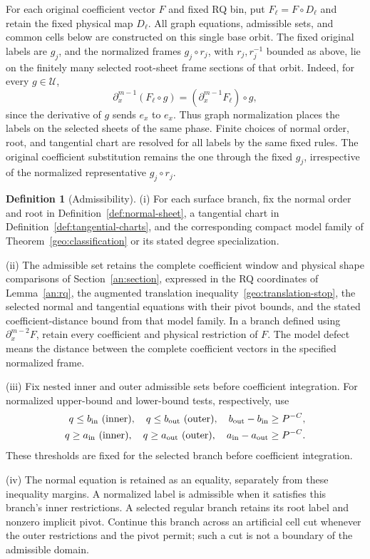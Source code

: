 \documentclass[11pt]{amsart}
\theoremstyle{definition}
\newtheorem{definition}{Definition}[section]
\theoremstyle{remark}
\numberwithin{equation}{section}
\begin{document}
For each original coefficient vector $F$ and fixed RQ bin, put $F_\ell=F\circ D_\ell$ and retain the fixed physical map $D_\ell$. All graph equations, admissible sets, and common cells below are constructed on this single base orbit. The fixed original labels are $g_j$, and the normalized frames $g_j\circ r_j$, with $r_j,r_j^{-1}$ bounded as above, lie on the finitely many selected root-sheet frame sections of that orbit. Indeed, for every $g\in\mathcal U$,
\[
\partial_x^{m-1}(F_\ell\circ g)=(\partial_x^{m-1}F_\ell)\circ g,
\]
since the derivative of $g$ sends $e_x$ to $e_x$. Thus graph normalization places the labels on the selected sheets of the same phase. Finite choices of normal order, root, and tangential chart are resolved for all labels by the same fixed rules. The original coefficient substitution remains the one through the fixed $g_j$, irrespective of the normalized representative $g_j\circ r_j$.

\begin{definition}[Admissibility]\label{def:admissibility}
\leavevmode\noindent\textup{(i)} For each surface branch, fix the normal order and root in Definition~\ref{def:normal-sheet}, a tangential chart in Definition~\ref{def:tangential-charts}, and the corresponding compact model family of Theorem~\ref{geo:classification} or its stated degree specialization.

\noindent\textup{(ii)} The admissible set retains the complete coefficient window and physical shape comparisons of Section~\ref{an:section}, expressed in the RQ coordinates of Lemma~\ref{an:rq}, the augmented translation inequality~\eqref{geo:translation-stop}, the selected normal and tangential equations with their pivot bounds, and the stated coefficient-distance bound from that model family. In a branch defined using $\partial_x^{m-2}F$, retain every coefficient and physical restriction of $F$. The model defect means the distance between the complete coefficient vectors in the specified normalized frame.

\noindent\textup{(iii)} Fix nested inner and outer admissible sets before coefficient integration. For normalized upper-bound and lower-bound tests, respectively, use
\[
\begin{aligned}
q\le b_{\rm in}\ \text{(inner)},\quad q\le b_{\rm out}\ \text{(outer)},\quad b_{\rm out}-b_{\rm in}&\ge P^{-C},\\
q\ge a_{\rm in}\ \text{(inner)},\quad q\ge a_{\rm out}\ \text{(outer)},\quad a_{\rm in}-a_{\rm out}&\ge P^{-C}.
\end{aligned}
\]
These thresholds are fixed for the selected branch before coefficient integration.

\noindent\textup{(iv)} The normal equation is retained as an equality, separately from these inequality margins. A normalized label is admissible when it satisfies this branch's inner restrictions. A selected regular branch retains its root label and nonzero implicit pivot. Continue this branch across an artificial cell cut whenever the outer restrictions and the pivot permit; such a cut is not a boundary of the admissible domain.
\end{definition}
\end{document}
